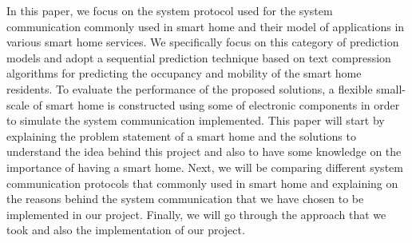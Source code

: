 In this paper, we focus on the system protocol used for the system communication commonly used in smart home and their model of applications in various smart home services. We specifically focus on this category of prediction models and adopt a sequential prediction technique based on text compression algorithms for predicting the occupancy and mobility of the smart home residents. To evaluate the performance of the proposed solutions, a flexible small-scale of smart home is constructed using some of electronic components in order to simulate the system communication implemented. This paper will start by explaining the problem statement of a smart home and the solutions to understand the idea behind this project and also to have some knowledge on the importance of having a smart home. Next, we will be comparing different system communication protocols that commonly used in smart home and explaining on the reasons behind the system communication that we have chosen to be implemented in our project. Finally, we will go through the approach that we took and also the implementation of our project.

